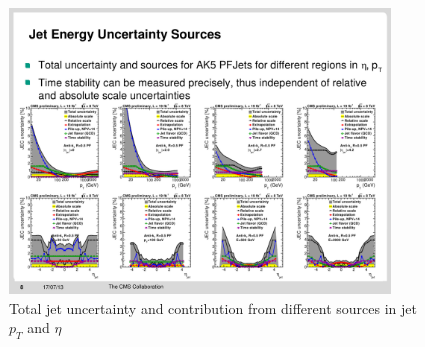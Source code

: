 \begin{figure}[htbp]
	\centering
		\includegraphics[width=0.9\textwidth]{Figures/jet_unc_err.pdf}
	\caption{Total jet uncertainty and contribution from different sources in jet $p_T$ and $\eta$ \cite{CMS-DP-2013-033}}
	\label{fig:tot_corr_err}
\end{figure}



